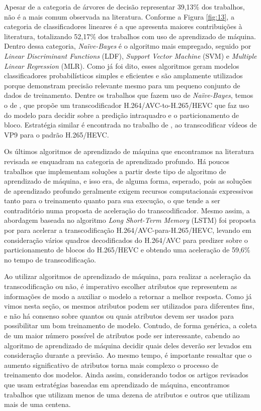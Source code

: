 Apesar de a categoria de árvores de decisão representar 39,13\% dos trabalhos, não é a mais comum observada na literatura. Conforme a Figura \ref{fig:13}, a categoria de classificadores lineares é a que apresenta maiores contribuições à literatura, totalizando 52,17\% dos trabalhos com uso de aprendizado de máquina. Dentro dessa categoria, \textit{Naïve-Bayes} é o algoritmo mais empregado, seguido por \textit{Linear Discriminant Functions} (LDF), \textit{Support Vector Machine} (SVM) e \textit{Multiple Linear Regression} (MLR). Como já foi dito, esses algoritmos geram modelos classificadores probabilísticos simples e eficientes \cite{bib:naivebayesref} e são amplamente utilizados porque demonstram precisão relevante mesmo para um pequeno conjunto de dados de treinamento. Dentre os trabalhos que fazem uso de \textit{Naïve-Bayes}, temos o de \citet{bib:honrubia_2016}, que propõe um transcodificador H.264/AVC-to-H.265/HEVC que faz uso do modelo para decidir sobre a predição intraquadro e o particionamento de bloco. Estratégia similar é encontrada no trabalho de \citet{bib:li_2017}, ao transcodificar vídeos de VP9 para o padrão H.265/HEVC.

Os últimos algoritmos de aprendizado de máquina que encontramos na literatura revisada se enquadram na categoria de aprendizado profundo. Há poucos trabalhos que implementam soluções a partir deste tipo de algoritmo de aprendizado de máquina, e isso era, de alguma forma, esperado, pois as soluções de aprendizado profundo geralmente exigem recursos computacionais expressivos tanto para o treinamento quanto para sua execução, o que tende a ser contraditório numa proposta de aceleração do transcodificador. Mesmo assim, a abordagem baseada no algoritmo \textit{Long Short-Term Memory} (LSTM) \cite{bib:graves_2012} foi proposta por \citet{bib:xu_2019} para acelerar a transcodificação H.264/AVC-para-H.265/HEVC, levando em consideração vários quadros decodificados do H.264/AVC para predizer sobre o particionamento de blocos do H.265/HEVC e obtendo uma aceleração de 59,6\% no tempo de transcodificação.

Ao utilizar algoritmos de aprendizado de máquina, para realizar a aceleração da transcodificação ou não, é imperativo escolher atributos que representem as informações de modo a auxiliar o modelo a retornar a melhor resposta. Como já vimos nesta seção, os mesmos atributos podem ser utilizados para diferentes fins, e não há consenso sobre quantos ou quais atributos devem ser usados para possibilitar um bom treinamento de modelo. Contudo, de forma genérica, a coleta de um maior número possível de atributos pode ser interessante, cabendo ao algoritmo de aprendizado de máquina decidir quais deles deverão ser levados em consideração durante a previsão. Ao mesmo tempo, é importante ressaltar que o aumento significativo de atributos torna mais complexo o processo de treinamento dos modelos. Ainda assim, considerando todos os artigos revisados que usam estratégias baseadas em aprendizado de máquina, encontramos trabalhos que utilizam menos de uma dezena de atributos e outros que utilizam mais de uma centena.

